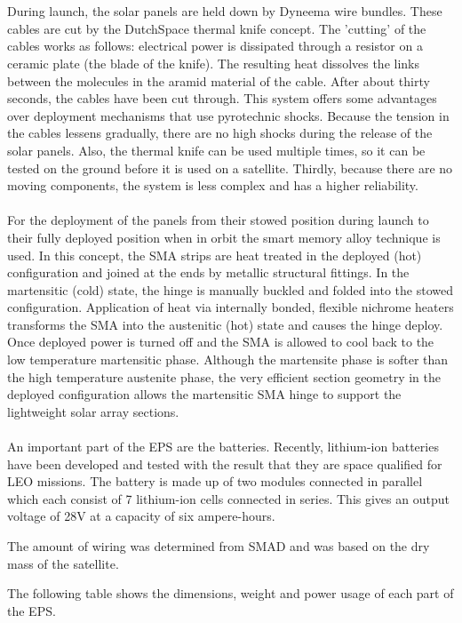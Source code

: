 \documentclass[11pt,a4paper,twoside]{book}
\begin{document}
\\\\
During launch, the solar panels are held down by Dyneema wire bundles. These cables are cut by the DutchSpace thermal knife concept. The 'cutting' of the cables works as follows: electrical power is dissipated through a resistor on a ceramic plate (the blade of the knife). The resulting heat dissolves the links between the molecules in the aramid material of the cable. After about thirty seconds, the cables have been cut through. This system offers some advantages over deployment mechanisms that use pyrotechnic shocks. Because the tension in the cables lessens gradually, there are no high shocks during the release of the solar panels. Also, the thermal knife can be used multiple times, so it can be tested on the ground before it is used on a satellite. Thirdly, because there are no moving components, the system is less complex and has a higher reliability.
\\\\
For the deployment of the panels from their stowed position during launch to their fully deployed position when in orbit the smart memory alloy technique is used. In this concept, the SMA strips are heat treated in the deployed (hot) configuration and joined at the ends by metallic structural fittings. In the martensitic (cold) state, the hinge is manually buckled and folded into the stowed configuration. Application of heat via internally bonded, flexible nichrome heaters transforms the SMA into the austenitic (hot) state and causes the hinge deploy. Once deployed power is turned off and the SMA is allowed to cool back to the low temperature martensitic phase. Although the martensite phase is softer than the high temperature austenite phase, the very efficient section geometry in the deployed configuration allows the martensitic SMA hinge to support the lightweight solar array sections.
\\\\
An important part of the EPS are the batteries. Recently, lithium-ion batteries have been developed and tested with the result that they are space qualified for LEO missions. The battery is made up of two modules connected in parallel which each consist of 7 lithium-ion cells connected in series. This gives an output voltage of 28V at a capacity of six ampere-hours.

The amount of wiring was determined from SMAD and was based on the dry mass of the satellite.

The following table shows the dimensions, weight and power usage of each part of the EPS.
\end{document}
